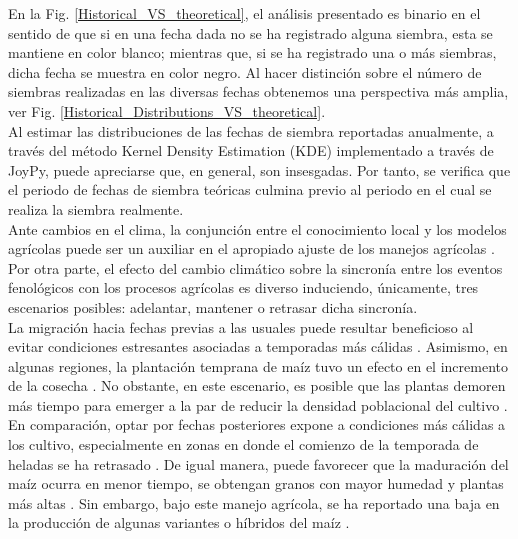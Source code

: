 En la Fig. \ref{Historical_VS_theoretical}, el análisis presentado es binario en el sentido de que si en una fecha dada no se ha registrado alguna siembra, esta se mantiene en color blanco; mientras que, si se ha registrado una o más siembras, dicha fecha se muestra en color negro. Al hacer distinción sobre el número de siembras realizadas en las diversas fechas obtenemos una perspectiva más amplia, ver Fig. \ref{Historical_Distributions_VS_theoretical}.\\ 

Al estimar las distribuciones de las fechas de siembra reportadas anualmente, a través del método Kernel Density Estimation (KDE) implementado a través de JoyPy, puede apreciarse que, en general, son insesgadas. Por tanto, se verifica que el periodo de fechas de siembra teóricas culmina previo al periodo en el cual se realiza la siembra realmente.\\ 

Ante cambios en el clima, la conjunción entre el conocimiento local y los modelos agrícolas puede ser un auxiliar en el apropiado ajuste de los manejos agrícolas \cite{vanOort_2017,Yang_2021}. Por otra parte, el efecto del cambio climático sobre la sincronía entre los eventos fenológicos con los procesos agrícolas es diverso \cite{Clark_2026,DJAMAN_2022, Maresma_2019, Mason_2018, Staggenborg_1999, Zhu_2022} induciendo, únicamente, tres escenarios posibles: adelantar, mantener o retrasar dicha sincronía.\\ 

La migración hacia fechas previas a las usuales puede resultar beneficioso al evitar condiciones estresantes asociadas a temporadas más cálidas \cite{Clark_2026}. Asimismo, en algunas regiones, la plantación temprana de maíz tuvo un efecto en el incremento de la cosecha \cite{Mason_2018, Staggenborg_1999}. No obstante, en este escenario, es posible que las plantas demoren más tiempo para emerger a la par de reducir la densidad poblacional del cultivo \cite{Maresma_2019}.\\


En comparación, optar por fechas posteriores expone a condiciones más cálidas a los cultivo, especialmente en zonas en donde el comienzo de la temporada de heladas se ha retrasado \cite{Clark_2026}. De igual manera, puede favorecer que la maduración del maíz ocurra en menor tiempo, se obtengan granos con mayor humedad y plantas más altas \cite{DJAMAN_2022,Maresma_2019, Zhou_2018}. Sin embargo, bajo este manejo agrícola, se ha reportado una baja en la producción de algunas variantes o híbridos del maíz \cite{Mason_2018, Staggenborg_1999,Zhu_2022}.\\ 


